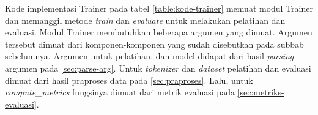 Kode implementasi Trainer pada tabel \ref{table:kode-trainer} memuat modul Trainer dan memanggil metode \textit{train} dan \textit{evaluate} untuk melakukan pelatihan dan evaluasi. Modul Trainer membutuhkan beberapa argumen yang dimuat. Argumen tersebut dimuat dari komponen-komponen yang sudah disebutkan pada subbab sebelumnya. Argumen untuk pelatihan, dan model didapat dari hasil \textit{parsing} argumen pada \ref{sec:parse-arg}. Untuk \textit{tokenizer} dan \textit{dataset} pelatihan dan evaluasi dimuat dari hasil praproses data pada \ref{sec:praproses}. Lalu, untuk \textit{compute\_metrics} fungsinya dimuat dari metrik evaluasi pada \ref{sec:metriks-evaluasi}. 
